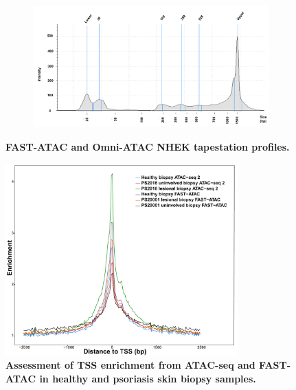 \begin{figure}[htbp]
\begin{subfigure}{0.70\textwidth}
\caption{\textbf{}} %
\end{subfigure}
\begin{subfigure}{0.70\textwidth}
\centering
\includegraphics[width=\textwidth]{./Appendix/pdfs/Chapter3/Omni_ATAC_NHEK_Rep1_tapestation}
\caption{\textbf{}} %
\end{subfigure}
\hfill
\caption[FAST-ATAC and Omni-ATAC NHEK tapestation profiles.]{\textbf{FAST-ATAC and Omni-ATAC NHEK tapestation profiles.} \\
}
\label{fig:NHEK_tapestation}
\end{figure}



\begin{figure}[htbp]
\centering
\includegraphics[width=0.8\textwidth]{./Appendix/pdfs/Chapter3/ATAC_skin_biopsy_samples_all_methods_TSS_enrichment_supplementary}
\caption[Assessment of TSS enrichment from ATAC-seq and FAST-ATAC in healthy and psoriasis skin biopsies samples.]{\textbf{Assessment of TSS enrichment from ATAC-seq and FAST-ATAC in healthy and psoriasis skin biopsy samples.}  }
\label{fig:TSS_skin_biopsies}
\end{figure}


